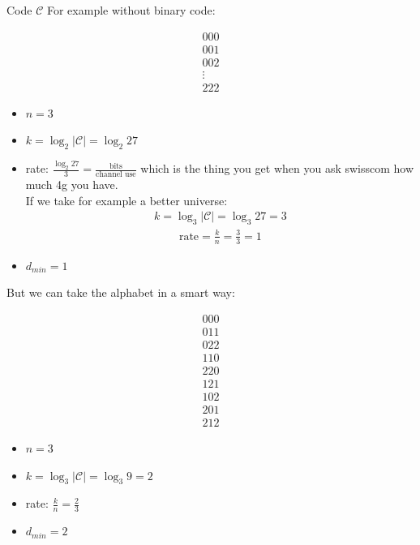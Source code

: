 \begin{parag}{Code $\mathcal{C}$}
    For example without binary code:
    \begin{minipage}{0.5\textwidth}
    \begin{align*} 000\\001\\002\\ \vdots\\ 222 \end{align*}
    \end{minipage}
    \begin{minipage}{0.5\textwidth}
    \begin{itemize}
        \item $n = 3$
        \item $k = \log_2 \left|\mathcal{C}\right| = \log_2 27 $
        \item rate: $\frac{\log_2 27}{3} = \frac{\text{bits}}{\text{channel use}}$ which is the thing you get when you ask swisscom how much 4g you have.
\\ If we take for example a better universe: 
\begin{align*} k = \log_3 \left|\mathcal{C}\right| = \log_3 27 = 3
\end{align*}
\begin{align*} \text{rate} =  \frac{k}{n} = \frac{3}{3} =  1 \end{align*}
        \item $d_{min} = 1$
    \end{itemize}
 
\end{minipage} 
    
But we can take the alphabet in a smart way:
\begin{minpage}{0.5\textwidth}
    \begin{align*} 000\\011\\022\\110\\220\\121\\102\\201\\212 \end{align*}
\end{minpage}
    \begin{minipage}{0.5\textwidth}
     \begin{itemize}
        \item $n = 3$
        \item $k = \log_3 \left|\mathcal{C}\right| = \log_3 9 = 2$
        \item rate: $\frac{k}{n} = \frac{2}{3}$
        \item $d_{min} = 2$
    \end{itemize}
    \end{minipage}
\end{parag}


